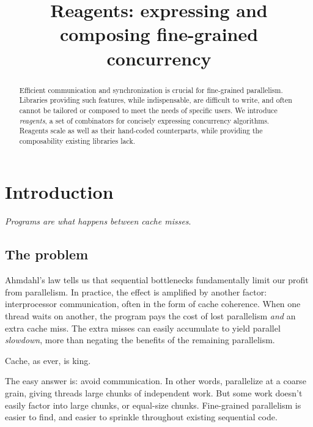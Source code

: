 \documentclass[preprint,nocopyrightspace]{sigplanconf}
\begin{document}
\authorinfo{}{}{}

\title{Reagents: expressing and composing fine-grained concurrency}
\maketitle

\begin{abstract}
Efficient communication and synchronization is crucial for fine-grained
parallelism.  Libraries providing such features, while indispensable, are
difficult to write, and often cannot be tailored or composed to meet the needs
of specific users.  We introduce \emph{reagents}, a set of combinators for
concisely expressing concurrency algorithms.  Reagents scale as well as their
hand-coded counterparts, while providing the composability existing libraries
lack.
\end{abstract}

\section{Introduction}

\emph{Programs are what happens between cache
  misses}. %

\subsection*{The problem}

Ahmdahl's law tells us that sequential bottlenecks fundamentally limit our
profit from parallelism.  In practice, the effect is amplified by
another factor: interprocessor communication, often in the form of cache
coherence.  When one thread waits on another, the program pays the cost of
lost parallelism \emph{and} an extra cache miss.  The extra misses can easily
accumulate to yield parallel \emph{slowdown}, more than negating the benefits
of the remaining parallelism.

Cache, as ever, is king.

The easy answer is: avoid communication.  In other words, parallelize at a
coarse grain, giving threads large chunks of independent work.  But some work
doesn't easily factor into large chunks, or equal-size chunks.  Fine-grained
parallelism is easier to find, and easier to sprinkle throughout existing
sequential code.
\end{document}
